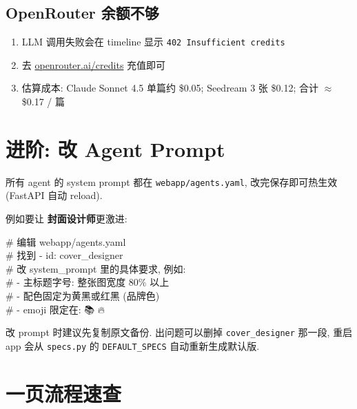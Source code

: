 \documentclass[11pt,a4paper]{article}
\begin{document}
\subsection{OpenRouter 余额不够}
\begin{enumerate}[leftmargin=*]
  \item LLM 调用失败会在 timeline 显示 \texttt{402 Insufficient credits}
  \item 去 \href{https://openrouter.ai/credits}{openrouter.ai/credits} 充值即可
  \item 估算成本: Claude Sonnet 4.5 单篇约 \$0.05; Seedream 3 张 \$0.12; 合计 \(\approx\) \$0.17 / 篇
\end{enumerate}

\section{进阶: 改 Agent Prompt}

所有 agent 的 system prompt 都在 \texttt{webapp/agents.yaml}, 改完保存即可热生效 (FastAPI 自动 reload).

例如要让 \textbf{封面设计师}更激进:

\begin{cmdbox}
\# 编辑 webapp/agents.yaml\\
\# 找到 - id: cover\_designer\\
\# 改 system\_prompt 里的具体要求, 例如:\\
\# \quad - 主标题字号: 整张图宽度 80\% 以上\\
\# \quad - 配色固定为黄黑或红黑 (品牌色)\\
\# \quad - emoji 限定在: 📚 🔥 💯
\end{cmdbox}

\begin{warnbox}
\small
改 prompt 时建议先复制原文备份. 出问题可以删掉 \texttt{cover\_designer} 那一段, 重启 app 会从 \texttt{specs.py} 的 \texttt{DEFAULT\_SPECS} 自动重新生成默认版.
\end{warnbox}

\section{一页流程速查}
\end{document}

